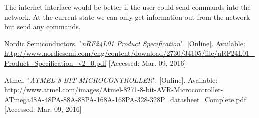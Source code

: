 \documentclass[a4paper,11pt]{article}
\begin{document}
The internet interface would be better if the user could send commands
into the network. At the current state we can only get information out
from the network but send any commands.

\begin{thebibliography}{2}

  Nordic Semiconductors. "\emph{nRF24L01 Product Specification}". [Online]. Available: \url{http://www.nordicsemi.com/eng/content/download/2730/34105/file/nRF24L01_Product_Specification_v2_0.pdf} [Accessed: Mar. 09, 2016]

  Atmel. "\emph{ATMEL 8-BIT MICROCONTROLLER}". [Online]. Available: \url{http://www.atmel.com/images/Atmel-8271-8-bit-AVR-Microcontroller-ATmega48A-48PA-88A-88PA-168A-168PA-328-328P_datasheet_Complete.pdf} [Accessed: Mar. 09, 2016]

\end{thebibliography}
\end{document}
